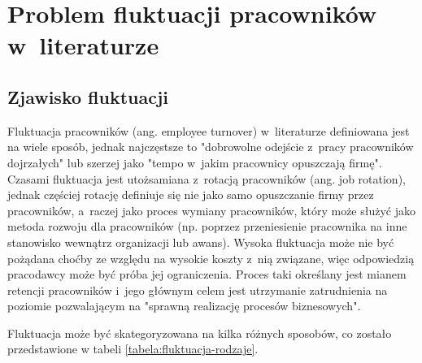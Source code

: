 

\chapter{Problem fluktuacji pracowników w~literaturze}\label{ch:knowladge-state}


\section{Zjawisko fluktuacji}\label{sec:zjawisko-fluktuacji}
Fluktuacja pracowników (ang. employee turnover) w~literaturze definiowana jest na wiele sposób, jednak najczęstsze to "dobrowolne odejście z~pracy pracowników dojrzałych"
lub szerzej jako "tempo w~jakim pracownicy opuszczają firmę".
Czasami fluktuacja jest utożsamiana z~rotacją pracowników (ang. job rotation),
jednak częściej rotację definiuje się nie jako samo opuszczanie firmy przez pracowników, a~raczej jako proces wymiany pracowników,
który może służyć jako metoda rozwoju dla pracowników (np. poprzez przeniesienie pracownika na inne stanowisko wewnątrz organizacji lub awans).
Wysoka fluktuacja może nie być pożądana choćby ze względu na wysokie koszty z~nią związane,
więc odpowiedzią pracodawcy może być próba jej ograniczenia.
Proces taki określany jest mianem retencji pracowników i~jego głównym celem jest utrzymanie zatrudnienia na poziomie pozwalającym na "sprawną realizację procesów biznesowych".

Fluktuacja może być skategoryzowana na kilka różnych sposobów, co zostało przedstawione w tabeli \ref{tabela:fluktuacja-rodzaje}.

